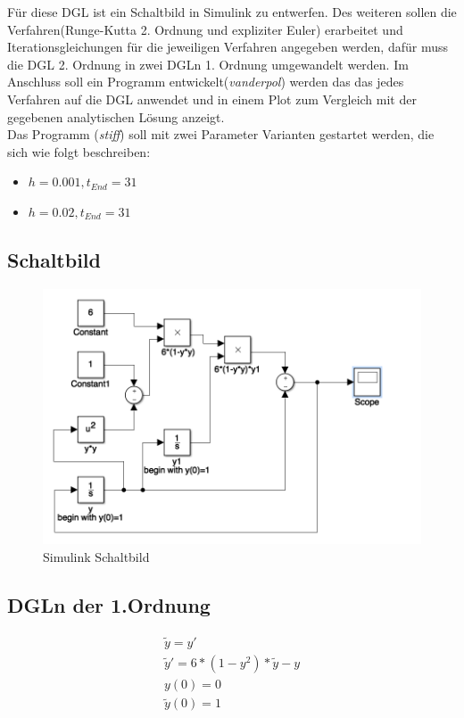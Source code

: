 \documentclass[]{scrartcl}
\begin{document}
Für diese DGL ist ein Schaltbild in Simulink zu entwerfen. Des weiteren sollen die Verfahren(Runge-Kutta 2. Ordnung und expliziter Euler) erarbeitet und Iterationsgleichungen für die jeweiligen Verfahren angegeben werden, dafür muss die DGL 2. Ordnung in zwei DGLn 1. Ordnung umgewandelt werden. Im Anschluss soll ein Programm entwickelt(\textit{vanderpol}) werden das das jedes Verfahren auf die DGL anwendet und in einem Plot zum Vergleich mit der gegebenen analytischen Lösung anzeigt.\\

Das Programm (\textit{stiff}) soll mit zwei Parameter Varianten gestartet werden, die sich wie folgt beschreiben:
\begin{itemize}
	\item $h = 0.001,  t_{End} = 31 $
	\item $h = 0.02,  t_{End} = 31 $
\end{itemize}

\subsection{Schaltbild}

\begin{figure}[H]
	\centering
	\includegraphics[width=1\linewidth]{a1_2_schaltbild}
	\caption{Simulink Schaltbild}
	\label{fig:a1_2_schaltbild}
\end{figure}

\subsection{DGLn der 1.Ordnung}
\begin{align}
\tilde{y} = y' \\
\tilde{y}' = 6 * (1 - y^{2}) * \tilde{y} - y \\
y(0)  = 0 \\
\tilde{y}(0) = 1
\end{align}
\end{document}
